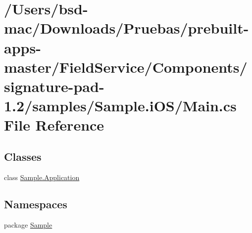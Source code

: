 \hypertarget{_components_2signature-pad-1_82_2samples_2_sample_8i_o_s_2_main_8cs}{\section{/\+Users/bsd-\/mac/\+Downloads/\+Pruebas/prebuilt-\/apps-\/master/\+Field\+Service/\+Components/signature-\/pad-\/1.2/samples/\+Sample.i\+O\+S/\+Main.cs File Reference}
\label{_components_2signature-pad-1_82_2samples_2_sample_8i_o_s_2_main_8cs}
}
\subsection*{Classes}
\begin{DoxyCompactItemize}
\item 
class \hyperlink{class_sample_1_1_application}{Sample.\+Application}
\end{DoxyCompactItemize}
\subsection*{Namespaces}
\begin{DoxyCompactItemize}
\item 
package \hyperlink{namespace_sample}{Sample}
\end{DoxyCompactItemize}

